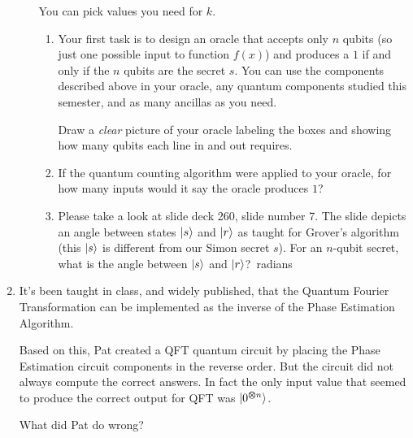 \documentclass[12pt]{article}
\begin{document}
\begin{enumerate}
\begin{itemize}
    You can pick values you need for $k$.
    \begin{enumerate}[label=\theenumi.\arabic*]
        \item Your first task is to design an oracle that accepts only $n$ qubits (so just one possible input to function $f(x)$) and produces a $1$ if and only if the $n$ qubits are the secret $s$.  You can use the components described above in your oracle, any quantum components studied this semester, and as many ancillas as you need.

        Draw a \emph{clear} picture of your oracle labeling the boxes and showing how many qubits each line in and out requires.
        \LeaveSpace[4in]{}
        \item If the quantum counting algorithm were applied to your oracle, for how many inputs would it say the oracle produces $1$?\Blank{}
        \item Please take a look at slide deck 260, slide number 7.  The slide depicts an angle between states $\ket{s}$ and $\ket{r}$ as taught for Grover's algorithm (this $\ket{s}$ is different from our Simon secret $s$).  For an $n$-qubit secret, what is the angle between $\ket{s}$ and $\ket{r}$?\Blank{}~radians
        
        
    \end{enumerate}
\end{itemize}

\item{}  It's been taught in class, and widely published, that the Quantum Fourier Transformation can be implemented as the inverse of the Phase Estimation Algorithm.

Based on this, Pat created a QFT quantum circuit by placing the Phase Estimation circuit components in the reverse order.  But the circuit did not always compute the correct answers.  In fact the only input value that seemed to produce the correct output for QFT was $\ket{0^{\bm{\otimes} n}}$.

What did Pat do wrong?
\LeaveSpace{}


\end{enumerate}
\end{document}
